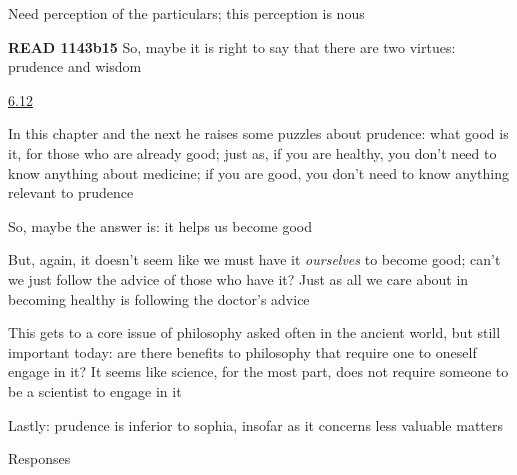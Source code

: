 \documentclass[11pt]{article}
\begin{document}
\noindent Need perception of the particulars; this perception is nous
\vspace*{2mm}

\noindent\textbf{READ 1143b15} So, maybe it is right to say that there are two virtues: prudence and wisdom
\vspace*{2mm}

\noindent\underline{6.12}
\vspace*{4mm}

\noindent In this chapter and the next he raises some puzzles about prudence: what good is it, for those who are already good; just as, if you are healthy, you don't need to know anything about medicine; if you are good, you don't need to know anything relevant to prudence
\vspace*{2mm}

\noindent So, maybe the answer is: it helps us become good
\vspace*{2mm}

\noindent But, again, it doesn't seem like we must have it \emph{ourselves} to become good; can't we just follow the advice of those who have it? Just as all we care about in becoming healthy is following the doctor's advice
\vspace*{2mm}

\noindent This gets to a core issue of philosophy asked often in the ancient world, but still important today: are there benefits to philosophy that require one to oneself engage in it? It seems like science, for the most part, does not require someone to be a scientist to engage in it
\vspace*{2mm}

\noindent Lastly: prudence is inferior to sophia, insofar as it concerns less valuable matters
\vspace*{2mm}

\noindent Responses
\end{document}
